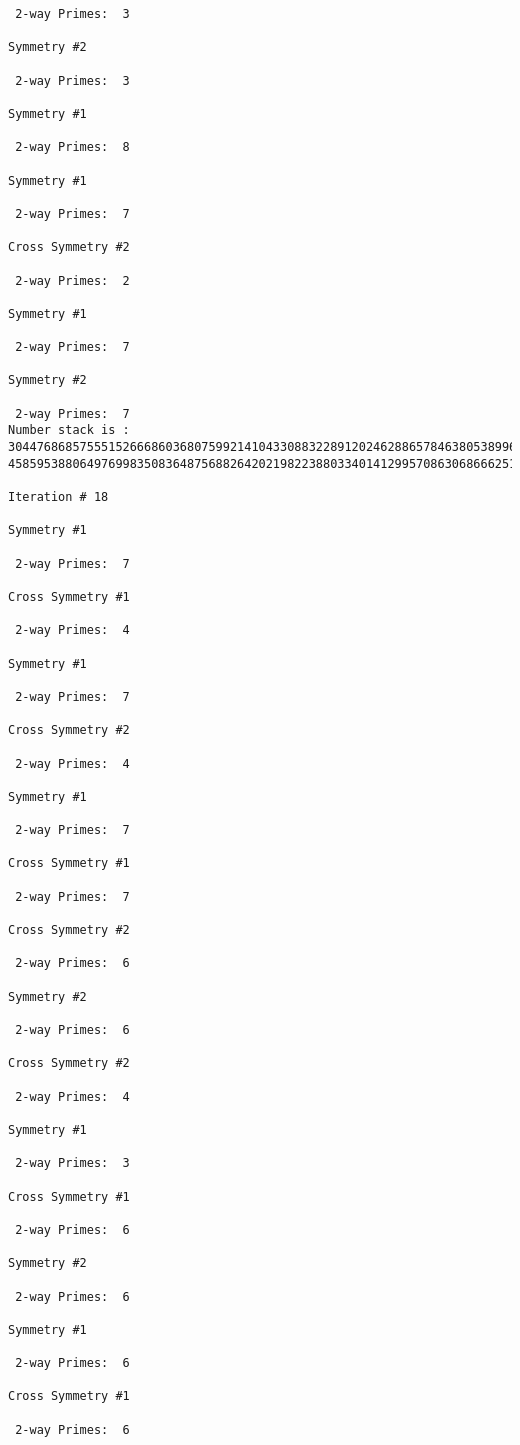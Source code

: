 \begin{verbatim}
 2-way Primes: 	3

Symmetry #2

 2-way Primes: 	3

Symmetry #1

 2-way Primes: 	8

Symmetry #1

 2-way Primes: 	7

Cross Symmetry #2

 2-way Primes: 	2

Symmetry #1

 2-way Primes: 	7

Symmetry #2

 2-way Primes: 	7
Number stack is :
30447686857555152666860368075992141043308832289120246288657846380538996794608835958544046240163340857
45859538806497699835083648756882642021982238803340141299570863068666251555758686744037580433610426404

Iteration #	18

Symmetry #1

 2-way Primes: 	7

Cross Symmetry #1

 2-way Primes: 	4

Symmetry #1

 2-way Primes: 	7

Cross Symmetry #2

 2-way Primes: 	4

Symmetry #1

 2-way Primes: 	7

Cross Symmetry #1

 2-way Primes: 	7

Cross Symmetry #2

 2-way Primes: 	6

Symmetry #2

 2-way Primes: 	6

Cross Symmetry #2

 2-way Primes: 	4

Symmetry #1

 2-way Primes: 	3

Cross Symmetry #1

 2-way Primes: 	6

Symmetry #2

 2-way Primes: 	6

Symmetry #1

 2-way Primes: 	6

Cross Symmetry #1

 2-way Primes: 	6


\end{verbatim}
